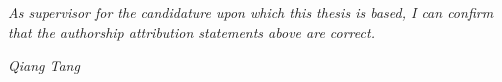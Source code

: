 
\vspace{5cm}

\emph{As supervisor for the candidature upon which this thesis is based, I can confirm that the authorship attribution statements above are correct.}

\vspace{2cm}

\noindent \emph{Qiang Tang}

